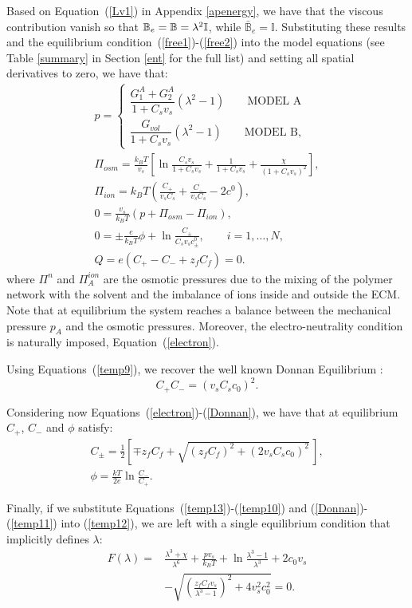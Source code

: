 Based on Equation~(\ref{Lv1}) in Appendix \ref{apenergy}, we have that the viscous contribution vanish so that $\mathbb{B}_e=\mathbb{B}= \lambda^2 \mathbb{I}$, while $\bar{\mathbb{B}}_e=\mathbb{I}$. Substituting these results and the equilibrium condition~(\ref{free1})-(\ref{free2}) into the model equations (see Table \ref{summary} in Section \ref{ent} for the full list) and setting all spatial derivatives to zero, we have that:
\begin{gather}
p = \begin{cases}
\dfrac{G^A_{1}+G^A_2}{1+C_s v_s}(\lambda^2-1)\qquad \text{MODEL A}\\[10pt]
\dfrac{G_{vol}}{1+C_s v_s}(\lambda^2-1)\qquad \text{MODEL B},
\end{cases}\label{presA}\\[5pt]
\Pi_{osm} = \frac{k_BT}{v_s} \left[\ln \frac{C_s v_s}{1+C_s v_s} + \frac{1}{1+C_sv_s} +\frac{\chi}{(1+C_s v_s)^2}\right],\label{temp13}\\
\Pi_{ion} = k_B T \left(\frac{C_+}{v_sC_s}+\frac{C_-}{v_sC_s}-2c^0\right),\label{temp10}\\
0 = \frac{v_s}{k_BT} (p+\Pi_{osm}-\Pi_{ion}),\label{temp12}\\[2mm]
0 = \pm\frac{e}{k_B T} \phi  + \ln \frac{C_\pm}{C_s v_s c_\pm^0},\qquad i=1,\ldots,N,\label{temp9}\\[2.5mm]
Q = e\left(C_+-C_-+z_f C_{f}\right)=0.\label{electron}
\end{gather}
where $\Pi^{n}$ and $\Pi^{ion}_A$ are the osmotic pressures due to the mixing of the polymer network with the solvent and the imbalance of ions inside and outside the ECM. 
Note that at equilibrium the system reaches a balance between the mechanical pressure $p_A$ and the osmotic pressures. Moreover, the electro-neutrality condition is naturally imposed, Equation~(\ref{electron}). 


Using Equations~(\ref{temp9}), we recover the well known Donnan Equilibrium \cite{DROZDOVph}:
\begin{equation}
C_+C_- = (v_sC_sc_0)^2.\label{Donnan}
\end{equation} 

Considering now Equations~(\ref{electron})-(\ref{Donnan}), we have that at equilibrium $C_+$, $C_-$ and $\phi$ satisfy:
\begin{eqnarray}
C_{\pm}= \frac{1}{2}\left[\mp z_fC_f+ \sqrt{(z_fC_f)^2+(2v_sC_sc_0)^2}\,\right],\label{eqion}\\
\phi = \frac{kT}{2e} \ln \frac{C_-}{C_+}.\label{temp11}
\end{eqnarray}

Finally, if we substitute Equations~(\ref{temp13})-(\ref{temp10}) and (\ref{Donnan})-(\ref{temp11}) into (\ref{temp12}), we are left with a single equilibrium condition that implicitly defines $\lambda$:
\begin{equation}
\begin{aligned}
F(\lambda)=&\frac{\lambda^3+\chi}{\lambda^6}+\frac{p v_s}{k_BT}+\ln \frac{\lambda^3-1}{\lambda^3} +2c_0v_s\\[1.5mm]
&-\sqrt{\left(\frac{z_fC_fv_s}{\lambda^3-1}\right)^2+4v_s^2c^2_0} =0.
\end{aligned}
\end{equation}